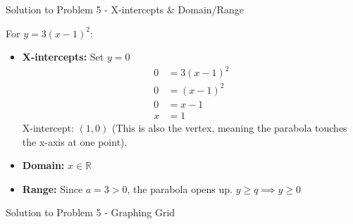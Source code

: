 \documentclass[aspectratio=169]{beamer}
\begin{document}
\begin{frame}{Solution to Problem 5 - X-intercepts & Domain/Range}
    \begin{tcolorbox}[colback=lightgray,colframe=accent,title=Solution 5 (Cont.)]
        \footnotesize
        For $y = 3(x-1)^2$:
        \begin{itemize}
            \item \textbf{X-intercepts:} Set $y=0$
                \begin{align*}
                    0 &= 3(x-1)^2 \\
                    0 &= (x-1)^2 \\
                    0 &= x-1 \\
                    x &= 1
                \end{align*}
                X-intercept: $(1,0)$ (This is also the vertex, meaning the parabola touches the x-axis at one point).
            \item \textbf{Domain:} $x \in \mathbb{R}$
            \item \textbf{Range:} Since $a=3>0$, the parabola opens up. $y \geq q \implies y \geq 0$
        \end{itemize}
    \end{tcolorbox}
\end{frame}

\begin{frame}{Solution to Problem 5 - Graphing Grid}
    \centering
\end{frame}
\end{document}
